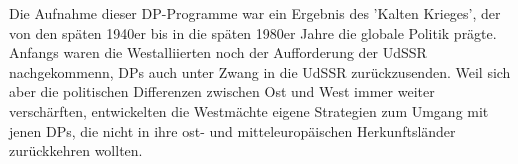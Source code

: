 \documentclass[letterpaper, 12pt]{article}
\begin{document}
Die Aufnahme dieser DP-Programme war ein Ergebnis des 'Kalten Krieges', der von den späten 1940er bis in die späten 1980er Jahre die globale Politik prägte. Anfangs waren die Westalliierten noch der Aufforderung der UdSSR nachgekommenn, DPs auch unter Zwang in die UdSSR zurückzusenden. Weil sich aber die politischen Differenzen zwischen Ost und West immer weiter verschärften, entwickelten die Westmächte eigene Strategien zum Umgang mit jenen DPs, die nicht in ihre ost- und mitteleuropäischen Herkunftsländer zurückkehren wollten.


\clearpage


\end{document}
